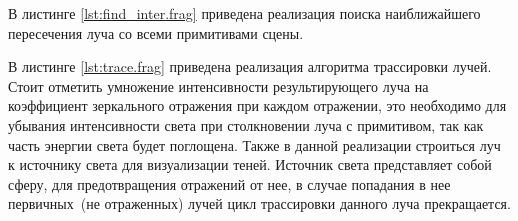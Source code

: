 В листинге \ref{lst:find_inter.frag} приведена реализация  поиска наиближайшего пересечения луча со всеми  примитивами сцены.

В листинге \ref{lst:trace.frag}  приведена реализация алгоритма трассировки лучей. 
Стоит отметить умножение интенсивности результирующего луча на 
коэффициент зеркального отражения
при каждом отражении, это необходимо для убывания интенсивности света при  столкновении луча  с примитивом,
так как часть энергии света будет поглощена. Также в данной реализации строиться луч к источнику света для
визуализации теней. Источник света представляет собой сферу, для предотвращения отражений от нее, в случае попадания в нее первичных~(не отраженных)
лучей цикл трассировки данного луча прекращается.












